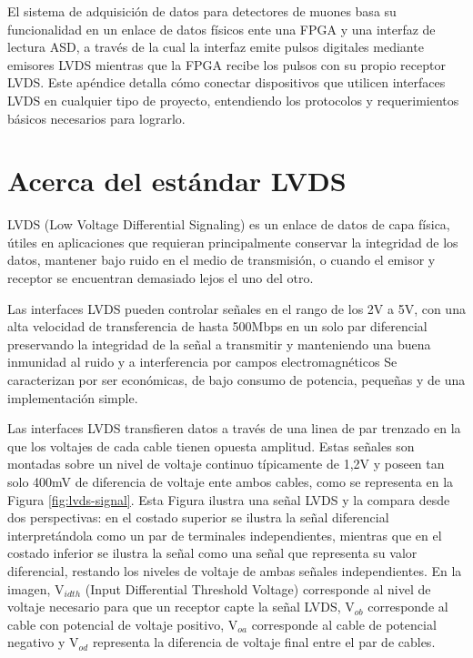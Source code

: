 El sistema de adquisición de datos para detectores de muones basa su funcionalidad en un enlace de datos físicos ente una FPGA y una interfaz de lectura ASD, a través de la cual la interfaz emite pulsos digitales mediante emisores LVDS mientras que la FPGA recibe los pulsos con su propio receptor LVDS. Este apéndice detalla cómo conectar dispositivos que utilicen interfaces LVDS en cualquier tipo de proyecto, entendiendo los protocolos y requerimientos básicos necesarios para lograrlo.

\section{Acerca del estándar LVDS}	
	LVDS (Low Voltage Differential Signaling) \cite{1996IEEESociety} es un enlace de datos de capa física, útiles en aplicaciones que requieran principalmente conservar la integridad de los datos, mantener bajo ruido en el medio de transmisión, o cuando el emisor y receptor se encuentran demasiado lejos el uno del otro.
	
	Las interfaces LVDS pueden controlar señales en el rango de los 2V a 5V, con una alta velocidad de transferencia de hasta 500Mbps en un solo par diferencial preservando la integridad de la señal a transmitir y manteniendo una buena inmunidad al ruido y a interferencia por campos electromagnéticos Se caracterizan por ser económicas, de bajo consumo de potencia, pequeñas y de una implementación simple.

	Las interfaces LVDS transfieren datos a través de una linea de par trenzado en la que los voltajes de cada cable tienen opuesta amplitud. Estas señales son montadas sobre un nivel de voltaje continuo típicamente de 1,2V y poseen tan solo 400mV de diferencia de voltaje ente ambos cables\cite{1996IEEESociety}, como se representa en la Figura \ref{fig:lvds-signal}. Esta Figura ilustra una señal LVDS y la compara desde dos perspectivas: en el costado superior se ilustra la señal diferencial interpretándola como un par de terminales independientes, mientras que en el costado inferior se ilustra la señal como una señal que representa su valor diferencial, restando los niveles de voltaje de ambas señales independientes. En la imagen, V$_{idth}$ (Input Differential Threshold Voltage) corresponde al nivel de voltaje necesario para que un receptor capte la señal LVDS,  V$_{ob}$ corresponde al cable con potencial de voltaje positivo,  V$_{oa}$ corresponde al cable de potencial negativo y  V$_{od}$ representa la diferencia de voltaje final entre el par de cables.
	

